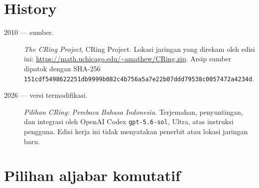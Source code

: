 \documentclass[11pt,openany]{book}
\begin{document}
\chapter*{History}
\begin{description}
\item[2010 --- sumber.] \emph{The CRing Project}, CRing Project. Lokasi
jaringan yang direkam oleh edisi ini:
\url{https://math.uchicago.edu/~amathew/CRing.zip}. Arsip sumber dipatok dengan
SHA-256
\texttt{151cdf5498622251db9999b082c4b756a5a7e22b07ddd79538c0057472a4234d}.
\item[2026 --- versi termodifikasi.] \emph{Pilihan CRing: Pembaca Bahasa
Indonesia}. Terjemahan, penyuntingan, dan integrasi oleh OpenAI Codex
\texttt{gpt-5.6-sol}, Ultra, atas instruksi pengguna. Edisi kerja ini tidak
menyatakan penerbit atau lokasi jaringan baru.
\end{description}

\tableofcontents

\mainmatter
\chapter{Pilihan aljabar komutatif}

\begingroup
\let\subsection\section

\endgroup







\backmatter
\end{document}
